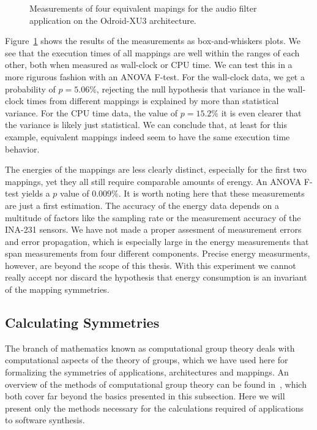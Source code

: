 \begin{figure}[h]
	\centering
\resizebox{0.95\textwidth}{!}{
     
 }
   \caption{Measurements of four equivalent mapings for the audio filter application on the Odroid-XU3 architecture.}
   \label{fig:symmetry_measurements}
\end{figure}

Figure~\ref{fig:symmetry_measurements} shows the results of the measurements as box-and-whiskers plots.
We see that the execution times of all mappings are well within the ranges of each other, both when measured as wall-clock or \ac{CPU} time.
We can test this in a more rigurous fashion with an \ac{ANOVA} F-test.
For the wall-clock data, we get a probability of $p = 5.06\%$, rejecting the null hypothesis that variance in the wall-clock times from different mappings is explained by more than statistical variance.
For the \ac{CPU} time data, the value of $p=15.2\%$ it is even clearer that the variance is likely just statistical.
We can conclude that, at least for this example, equivalent mappings indeed seem to have the same execution time behavior.

The energies of the mappings are less clearly distinct, especially for the first two mappings, yet they all still require comparable amounts of erengy.
An \ac{ANOVA} F-test yields a $p$ value of $0.009\%$.
It is worth noting here that these measurements are just a first estimation.
The accuracy of the energy data depends on a multitude of factors like the sampling rate or the measurement accuracy of the INA-231 sensors.
We have not made a proper assesment of measurement errors and error propagation, which is especially large in the energy measurements that span measurements from four different components.
Precise energy measurments, however, are beyond the scope of this thesis.
With this experiment we cannot really accept nor discard the hypothesis that energy consumption is an invariant of the mapping symmetries.

\subsection{Calculating Symmetries}

The branch of mathematics known as computational group theory deals with computational aspects of the theory of groups, which we have used here for formalizing the symmetries of applications, architectures and mappings. 
An overview of the methods of computational group theory can be found in~\cite{holt,seress2003permutation}, which both cover far beyond the basics presented in this subsection.
Here we will present only the methods necessary for the calculations required of applications to software synthesis.

